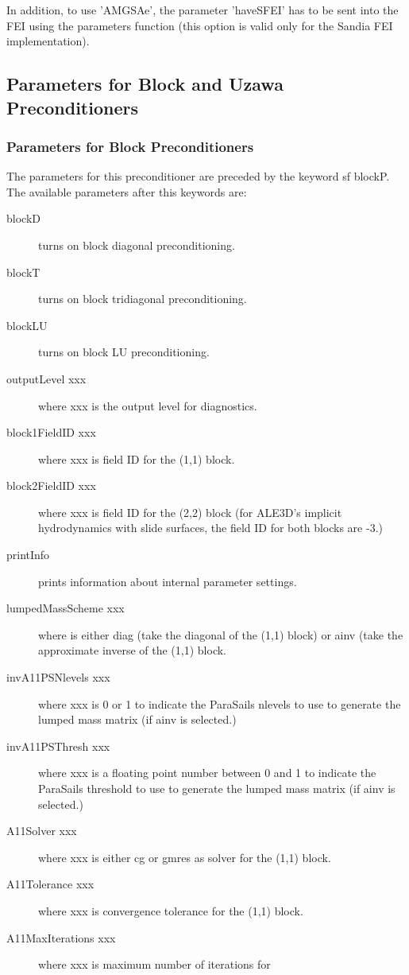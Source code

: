 In addition, to use 'AMGSAe', the parameter 'haveSFEI' has to be sent into
the FEI using the parameters function (this option is valid only for the
Sandia FEI implementation).

\subsection{Parameters for Block and Uzawa Preconditioners}
\subsubsection{Parameters for Block Preconditioners}
The parameters for this preconditioner are preceded by the keyword {sf blockP}.
The available parameters after this keywords are:
\begin{description}
\item[blockD] turns on block diagonal preconditioning.
\item[blockT] turns on block tridiagonal preconditioning.
\item[blockLU] turns on block LU preconditioning.
\item[outputLevel xxx] where xxx is the output level for diagnostics.
\item[block1FieldID xxx] where xxx is field ID for the (1,1) block.
\item[block2FieldID xxx] where xxx is field ID for the (2,2) block (for
    ALE3D's implicit hydrodynamics with slide surfaces, the field ID for
    both blocks are -3.)
\item[printInfo] prints information about internal parameter settings.
\item[lumpedMassScheme xxx] where is either {\sf diag} (take the diagonal
     of the (1,1) block) or {\sf ainv} (take the approximate inverse of
     the (1,1) block.
\item[invA11PSNlevels xxx] where xxx is 0 or 1 to indicate the ParaSails
     nlevels to use to generate the lumped mass matrix (if {\sf ainv} is
     selected.)
\item[invA11PSThresh xxx] where xxx is a floating point number between 0 
     and 1 to indicate the ParaSails threshold to use to generate the lumped 
     mass matrix (if {\sf ainv} is selected.)
\item[A11Solver xxx] where xxx is either {\sf cg} or {\sf gmres} as solver
     for the (1,1) block.
\item[A11Tolerance xxx] where xxx is convergence tolerance for the
     (1,1) block.
\item[A11MaxIterations xxx] where xxx is maximum number of iterations for

\end{description}
